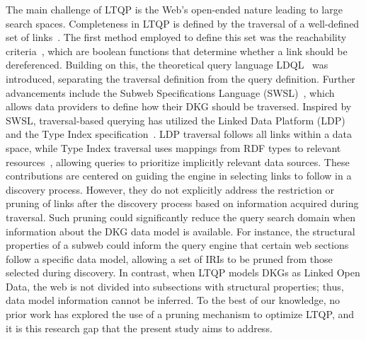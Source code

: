 The main challenge of LTQP is the Web's open-ended nature leading to large search spaces.
Completeness in LTQP is defined by the traversal of a well-defined set of links~\cite{Hartig2012}.
The first method employed to define this set was the reachability criteria~\cite{Hartig2012}, which are boolean functions that determine whether a link should be dereferenced.
Building on this, the theoretical query language LDQL~\cite{hartigLDQL} was introduced, separating the traversal definition from the query definition.
Further advancements include the Subweb Specifications Language (SWSL)~\cite{Bogaerts2021LinkTW}, which allows data providers to define how their DKG should be traversed.
Inspired by SWSL, traversal-based querying has utilized the Linked Data Platform (LDP) and the Type Index specification~\cite{Taelman2023}.  
LDP traversal follows all links within a data space, while Type Index traversal uses mappings from RDF types to relevant resources~\cite{solidTypeIndexes}, allowing queries to prioritize implicitly relevant data sources.
These contributions are centered on guiding the engine in selecting links to follow in a discovery process.
However, they do not explicitly address the restriction or pruning of links after the discovery process based on information acquired during traversal. 
Such pruning could significantly reduce the query search domain when information about the DKG data model is available. 
For instance, the structural properties of a subweb could inform the query engine that certain web sections follow a specific data model, allowing a set of IRIs to be pruned from those selected during discovery. 
In contrast, when LTQP models DKGs as Linked Open Data, the web is not divided into subsections with structural properties; thus, data model information cannot be inferred. 
To the best of our knowledge, no prior work has explored the use of a pruning mechanism to optimize LTQP, and it is this research gap that the present study aims to address.



